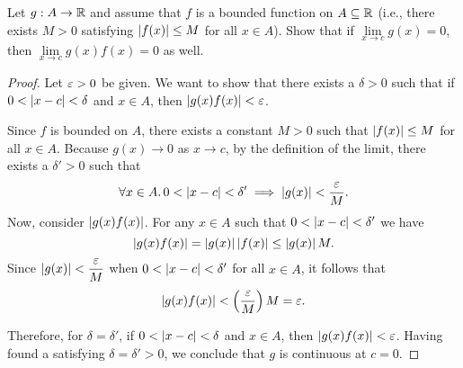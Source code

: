 \begin{problem}
  Let $g : A \to \mathbb{R}$ and assume that $f$ is a bounded function on $A \subseteq \mathbb{R}$ 
  (i.e., there exists $M > 0$ satisfying $\left\lvert f(x) \right\rvert \leq M$ for all $x \in A$).
  Show that if $\lim\limits_{x \to c} g(x) = 0$, then $\lim\limits_{x \to
  c} g(x)f(x) = 0$ as well.

  \begin{proof}
    Let $\varepsilon > 0$ be given. We want to show that there exists a $\delta > 0$
    such that if $0 < \left\lvert x - c \right\rvert < \delta$ and $x \in A$, then $\left\lvert g(x)f(x) \right\rvert < \varepsilon$.

    Since $f$ is bounded on $A$, there exists a constant $M > 0$ such that
    $\left\lvert f(x) \right\rvert \leq M$ for all $x \in A$. Because $g(x) \to 0$ as $x \to c$,
    by the definition of the limit, there exists a $\delta' > 0$ such that
    \[
      \forall x \in A.\, 0 < \left\lvert x - c \right\rvert < \delta' \implies \left\lvert g(x) \right\rvert < \frac{\varepsilon}{M}.
    \]
    Now, consider $\left\lvert g(x)f(x) \right\rvert$. For any $x \in A$ such that $0 < \left\lvert x - c \right\rvert < \delta'$ we have
    \[
      \left\lvert g(x)f(x) \right\rvert = \left\lvert g(x) \right\rvert \left\lvert f(x) \right\rvert \leq \left\lvert g(x) \right\rvert M.
    \]
    Since $\left\lvert g(x) \right\rvert < \dfrac{\varepsilon}{M}$ when $0 < \left\lvert x - c \right\rvert < \delta'$ for all $x \in A$,
    it follows that
    \[
      \left\lvert g(x)f(x) \right\rvert < \left( \frac{\varepsilon}{M} \right) M = \varepsilon.
    \]

    Therefore, for $\delta = \delta'$, if $0 < \left\lvert x - c \right\rvert < \delta$ and $x \in A$, 
    then $\left\lvert g(x)f(x) \right\rvert < \varepsilon$. Having found a satisfying $\delta = \delta' > 0$,
    we conclude that $g$ is continuous at $c = 0$.
  \end{proof}

\end{problem}

